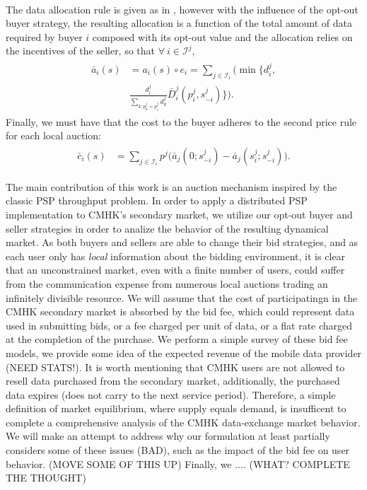 \documentclass[12pt]{article}
\theoremstyle{definition}
\newcommand{\mcI}{\mathcal{I}}
\begin{document}
\begin{multicols}{2}
\begin{align}
\end{align}
The data allocation rule is given as in \cite{semret}, however with the
influence of the opt-out buyer strategy, the resulting allocation is a function of the total amount of data
required by buyer $i$ composed with its opt-out value and the allocation relies
on the incentives of the seller, so that $\forall \ i \in \mcI^j$,
\begin{align}\label{dataallocation}
\begin{split}
    \bar{a}_i(s) &= a_i(s) \circ e_i =
\displaystyle\sum_{j\in\mcI_i}\bigg(\min\bigg\lbrace d_i^j,
\\
    &\frac{d_i^j}{\sum_{k:p_k^j=
p_i^j}d_k^j}
\bar{D}_i^j(p_i^j,s_{-i}^j)\bigg\rbrace\bigg).
\end{split}
\end{align}
Finally, we must have that the cost to the buyer adheres to the second price rule for each local auction:
\begin{align}\label{datacost}
\begin{split}
    \bar{c}_i(s) &= \displaystyle\sum_{j\in\mcI_i} 
p^j \bigg(\bar{a}_j(0; s_{-i}^j)
    -\bar{a}_j(s_i^j;s_{-i}^j)\bigg).
\end{split}
\end{align}


The main contribution of this work 
is an auction mechanism inspired by the classic PSP throughput problem. In
order to apply a distributed PSP implementation to CMHK's secondary market,
we utilize our opt-out buyer and seller strategies in order to analize the
behavior of the resulting dynamical market. As both buyers and sellers are able
to change their bid strategies, and as each user only has \emph{local}
information about the bidding environment, it is clear that an unconstrained
market, even with a finite number of users, could suffer from the communication
expense from numerous local auctions trading an infinitely divisible resource.
We will assume that the cost of participatingn in the CMHK secondary market is
absorbed by the bid fee, which could represent data used in submitting bids, or
a fee charged per unit of data, or a flat rate charged at the completion of the
purchase. We perform a simple survey of these bid fee models, we
provide some idea of the expected revenue of the mobile data provider (NEED
STATS!). It is worth mentioning that CMHK users are not allowed to resell data purchased from the secondary
market, additionally, the purchased data expires (does not carry to the next
service period). Therefore, a simple definition of market equilibrium, where
supply equals demand, is insufficent to complete a comprehensive analysis of
the CMHK data-exchange market behavior. We will make an attempt to address why
our formulation at least partially considers some of these issues (BAD), such
as the impact of the bid fee on user behavior. (MOVE SOME OF THIS UP)
Finally, we  .... (WHAT? COMPLETE THE THOUGHT)


\end{multicols}
\end{document}
